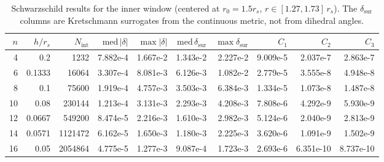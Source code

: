 \documentclass[11pt,letterpaper]{article}
\begin{document}
\begin{table}[ht]\centering\small
\begin{tabular}{rrrrrrrrrr}
\toprule
$n$ & $h/r_{s}$ & $N_{\mathrm{int}}$ & $\mathrm{med}\,|\delta|$ & $\max|\delta|$ & $\mathrm{med}\,\delta_{\mathrm{sur}}$ & $\max\delta_{\mathrm{sur}}$ & $C_{1}$ & $C_{2}$ & $C_{3}$\\
\midrule
4 & 0.2 & 1232 & 7.882e-4 & 1.667e-2 & 1.343e-2 & 2.227e-2 & 9.009e-5 & 2.037e-7 & 2.863e-7\\
6 & 0.1333 & 16064 & 3.307e-4 & 8.081e-3 & 6.126e-3 & 1.082e-2 & 2.779e-5 & 3.555e-8 & 4.948e-8\\
8 & 0.1 & 75600 & 1.919e-4 & 4.757e-3 & 3.503e-3 & 6.384e-3 & 1.334e-5 & 1.073e-8 & 1.487e-8\\
10 & 0.08 & 230144 & 1.213e-4 & 3.131e-3 & 2.293e-3 & 4.208e-3 & 7.808e-6 & 4.292e-9 & 5.930e-9\\
12 & 0.0667 & 549200 & 8.474e-5 & 2.216e-3 & 1.610e-3 & 2.982e-3 & 5.124e-6 & 2.040e-9 & 2.813e-9\\
14 & 0.0571 & 1121472 & 6.162e-5 & 1.650e-3 & 1.180e-3 & 2.225e-3 & 3.620e-6 & 1.091e-9 & 1.502e-9\\
16 & 0.05 & 2054864 & 4.775e-5 & 1.277e-3 & 9.087e-4 & 1.723e-3 & 2.693e-6 & 6.351e-10 & 8.737e-10\\
\bottomrule
\end{tabular}
\caption{Schwarzschild results for the inner window (centered at $r_{0}=1.5r_{s}$, $r\in[1.27,1.73]\,r_{s}$). The $\delta_{\mathrm{sur}}$ columns are Kretschmann surrogates from the continuous metric, not from dihedral angles.}
\label{tab:schwinner}
\end{table}
\end{document}
